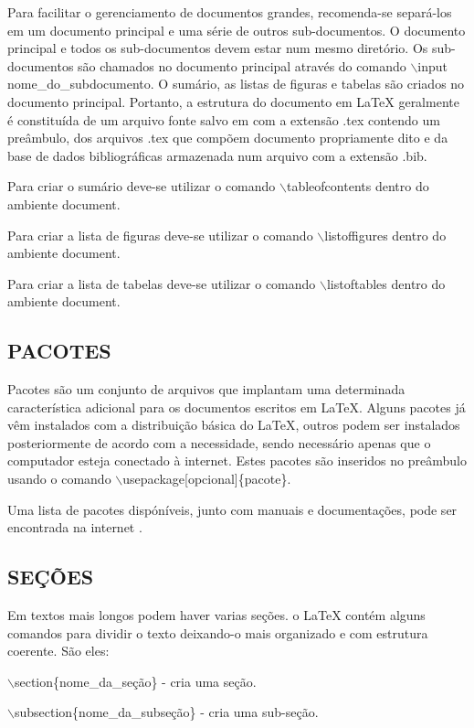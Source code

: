 Para facilitar o gerenciamento de documentos grandes, recomenda-se separá-los em um documento principal e uma série de outros sub-documentos. O documento principal e todos os sub-documentos devem estar num mesmo diretório. Os sub-documentos são chamados no documento principal através do comando $\backslash$input nome\_do\_subdocumento. O sumário, as listas de figuras e tabelas são criados no documento principal. Portanto, a estrutura do documento em LaTeX geralmente é constituída de um arquivo fonte salvo em com a extensão .tex contendo um preâmbulo, dos arquivos .tex que compõem documento propriamente dito e da base de dados bibliográficas armazenada num arquivo com a extensão .bib.

Para criar o sumário deve-se utilizar o comando $\backslash$tableofcontents dentro do ambiente document.

Para criar a lista de figuras deve-se utilizar o comando $\backslash$listoffigures dentro do ambiente document.

Para criar a lista de tabelas deve-se utilizar o comando $\backslash$listoftables dentro do ambiente document.

\subsection{PACOTES}
Pacotes são um conjunto de arquivos que implantam uma determinada característica adicional para os documentos escritos em LaTeX. Alguns pacotes já vêm instalados com a distribuição básica do LaTeX, outros podem ser instalados posteriormente de acordo com a necessidade, sendo necessário apenas que o computador esteja conectado à internet. Estes pacotes são inseridos no preâmbulo usando o comando $\backslash$usepackage[opcional]\{pacote\}.

Uma lista de pacotes dispóníveis, junto com manuais e documentações, pode ser encontrada na internet \cite{TeXdoc2018}.

\subsection{SEÇÕES}
Em textos mais longos podem haver varias seções. o LaTeX contém alguns
comandos para dividir o texto deixando-o mais organizado e com estrutura coerente. São eles:

$\backslash$section\{nome\_da\_seção\} - cria uma seção.

$\backslash$subsection\{nome\_da\_subseção\} - cria uma sub-seção.

